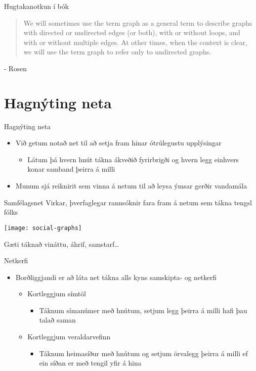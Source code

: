 \documentclass{beamer}
\begin{document}
\begin{frame}{Hugtakanotkun í bók}
\begin{quotation}
We will sometimes use the term graph as a general term to describe graphs with directed or undirected edges
(or both), with or without loops, and with or without multiple edges. At other times, when the
context is clear, we will use the term graph to refer only to undirected graphs.
\end{quotation} - Rosen

\end{frame}

\section{Hagnýting neta}

\begin{frame}{Hagnýting neta}
\begin{itemize}
 \item Við getum notað net til að setja fram hinar ótrúlegustu upplýsingar
 \begin{itemize}
  \item Látum þá hvern hnút tákna ákveðið fyrirbrigði og hvern legg einhvers konar samband þeirra á milli
 \end{itemize}
 \item Munum sjá reiknirit sem vinna á netum til að leysa ýmsar gerðir vandamála
\end{itemize}
\end{frame}

\begin{frame}{Samfélagsnet}
Virkar, þverfaglegar rannsóknir fara fram á netum sem tákna tengsl fólks
\begin{center}
\texttt{[image: social-graphs]}
\end{center}
Gæti táknað vináttu, áhrif, samstarf\ldots
\end{frame}

\begin{frame}{Netkerfi}
\begin{itemize}
 \item Borðliggjandi er að láta net tákna alls kyns samskipta- og netkerfi
 \begin{itemize}
  \item Kortleggjum símtöl
  \begin{itemize}
   \item Táknum símanúmer með hnútum, setjum legg þeirra á milli hafi þau talað saman
  \end{itemize}
  \item Kortleggjum veraldarvefinn
  \begin{itemize}
   \item Táknum heimasíður með hnútum og setjum örvalegg þeirra á milli ef ein síðan er með tengil yfir á hina
  \end{itemize}
 \end{itemize}
\end{itemize}
\end{frame}
\end{document}
